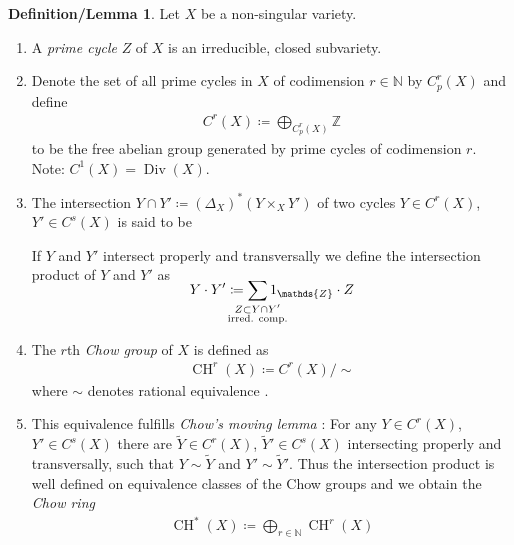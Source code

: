 \documentclass[english]{scrartcl}
\theoremstyle{definition}
\newtheorem{DefLem}[Def]{Definition/Lemma}
\theoremstyle{remark}
\newcommand*{\N}{\mathds{N}}
\newcommand*{\Z}{\mathds{Z}}
\DeclareMathOperator{\codim}{codim} %
\newcommand*{\intProd}[2]{{#1\cdot#2}} %
\newcommand*{\Diag}[1]{{\Delta_{#1}}} %
\DeclareMathOperator{\CH}{CH} %
\DeclareMathOperator{\Div}{Div} %
\begin{document}
\begin{DefLem}
  Let $X$ be a non-singular variety.
  \begin{enumerate}
  \item A \emph{prime cycle} $Z$ of $X$ is an irreducible, closed
    subvariety.
  \item Denote the set of all prime cycles in $X$ of codimension
    $r\in\N$ by $C_p^r(X)$ and define
    \begin{gather*}
      C^r(X) \coloneqq \bigoplus_{C_p^r(X)}\Z
    \end{gather*}
    to be the free abelian group generated by prime cycles of
    codimension $r$.
    Note: $C^1(X)=\Div(X)$.
  \item The intersection
    $Y\cap Y'\coloneqq (\Diag{X})^*(Y\times_X Y')$ of two cycles 
    $Y\in C^r(X)$, $Y'\in C^s(X)$ is said to be
    If $Y$ and $Y'$ intersect properly and transversally we define
    the intersection product of $Y$ and $Y'$ as
    \begin{gather*}
      \SwapAboveDisplaySkip
      \intProd{Y}{Y'} \coloneqq
      \sum_{\mathclap{
          \substack{Z\subset Y\cap Y'\\
            \text{irred. comp.}
          }}} 1_\Z\cdot Z
    \end{gather*}
  \item The $r$th \emph{Chow group} of $X$ is defined as
    \begin{gather*}
      \CH^r(X) \coloneqq C^r(X)/\sim
    \end{gather*}
    where $\sim$ denotes rational equivalence
    \cite[see][p.\,426]{hartshorne}.
  \item This equivalence fulfills \emph{Chow's moving lemma}
    \cite[][p.\,427]{hartshorne}:
    For any $Y\in C^r(X)$, $Y'\in C^s(X)$ there are
    $\widetilde Y\in C^r(X)$, $\widetilde Y'\in C^s(X)$ intersecting
    properly and transversally, such that $Y\sim\widetilde Y$ and
    $Y'\sim\widetilde Y'$.
    Thus the intersection product is well defined on equivalence
    classes of the Chow groups and we obtain the \emph{Chow ring}
    \begin{gather*}
      \CH^*(X) \coloneqq \bigoplus_{r\in\N} \CH^r(X)
    \end{gather*}
  \end{enumerate}
\end{DefLem}
\end{document}
